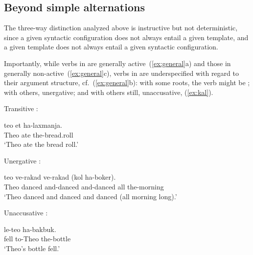 \begin{exe}
\begin{xlist}
\begin{exe}
\begin{exe}
\begin{exe}
\begin{exe}
\begin{xlist}
\begin{exe}
\begin{xlist}
\begin{xlist}
\begin{xlist}
\begin{exe}
\begin{xlist}
\begin{exe}
\begin{exe}
\begin{xlist}
\begin{exe}
\begin{xlist}
\begin{exe}
\begin{exe}
\begin{xlist}
\begin{exe}
\begin{xlist}
\begin{exe}
\begin{xlist}
\begin{exe}
\begin{exe}
\begin{xlist}
\begin{exe}
\begin{exe}
\begin{xlist}
\begin{exe}
\begin{xlist}
\begin{exe}
\begin{xlist}
\begin{xlist}
\begin{exe}
\begin{exe}
\begin{xlist}
\begin{exe}
\begin{xlist}
\begin{exe}
\begin{xlist}
\begin{exe}
\begin{xlist}
\begin{exe}
\begin{exe}
\begin{exe}
\begin{exe}
	\subsection{Beyond simple alternations}
The three-way distinction analyzed above is instructive but not deterministic, since a given syntactic configuration does not always entail a given template, and a given template does not always entail a given syntactic configuration.

Importantly, while verbs in {\thif} are generally active~(\ref{ex:general}a) and those in {\tnif} generally non-active~(\ref{ex:general}c), verbs in {\tkal} are underspecified with regard to their argument structure, cf.~(\ref{ex:general}b): with some roots, the verb might be ; with others, unergative; and with others still, unaccusative, (\ref{ex:kal}).
 \begin{exe}
 \ex \label{ex:kal} 
 \begin{xlist} 
 	\ex  Transitive {\tkal}: 
	
 		\gll  teo  et ha-laxmanja.\\
 		  Theo ate  the-bread.roll\\
 		\glt `Theo ate the bread roll.' 
	

 	\ex  Unergative {\tkal}: 
	
 		\gll  teo  ve-rakad ve-rakad (kol ha-boker).\\
 		  Theo danced and-danced and-danced all the-morning\\
 		\glt `Theo danced and danced and danced (all morning long).' 
	

 	\ex  Unaccusative {\tkal}: 
	
 		\gll  {} le-teo ha-bakbuk.\\
 		  fell to-Theo the-bottle\\
 		\glt `Theo's bottle fell.' 
	
	
 \z
\z 


\end{xlist}
\end{exe}
\end{exe}
\end{exe}
\end{exe}
\end{exe}
\end{xlist}
\end{exe}
\end{xlist}
\end{exe}
\end{xlist}
\end{exe}
\end{xlist}
\end{exe}
\end{exe}
\end{xlist}
\end{xlist}
\end{exe}
\end{xlist}
\end{exe}
\end{xlist}
\end{exe}
\end{exe}
\end{xlist}
\end{exe}
\end{exe}
\end{xlist}
\end{exe}
\end{xlist}
\end{exe}
\end{xlist}
\end{exe}
\end{exe}
\end{xlist}
\end{exe}
\end{xlist}
\end{exe}
\end{exe}
\end{xlist}
\end{exe}
\end{xlist}
\end{xlist}
\end{xlist}
\end{exe}
\end{xlist}
\end{exe}
\end{exe}
\end{exe}
\end{exe}
\end{xlist}
\end{exe}
